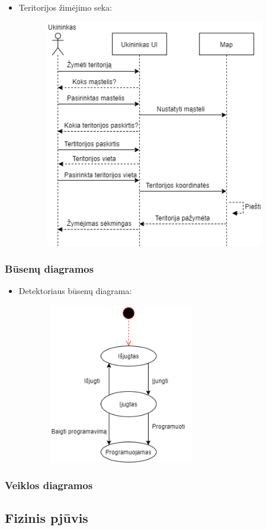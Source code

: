 \documentclass[oneside]{VUMIFPSkursinis}
\begin{document}
\begin{itemize}
\item Teritorijos žimėjimo seka:
	\begin{figure}[H]
		\centering	
	\includegraphics[width=10cm,height=10cm,keepaspectratio]{ŽymėtiTeritorijas.png}
	\caption{}
	\label{fig:ŽymėtiTeritorijas}
\end{figure}

\end{itemize}
\subsubsection{Būsenų diagramos}
\begin{itemize}
\item Detektoriaus būsenų diagrama:

		\begin{figure}[H]
		\centering	
	\includegraphics[width=7cm,height=7cm,keepaspectratio]{BusenuDetektorius.png}
	\caption{}
	\label{fig:BusenuDetektorius}
\end{figure}

\end{itemize}
\subsubsection{Veiklos diagramos}
\subsection{Fizinis pjūvis}



\end{document}
